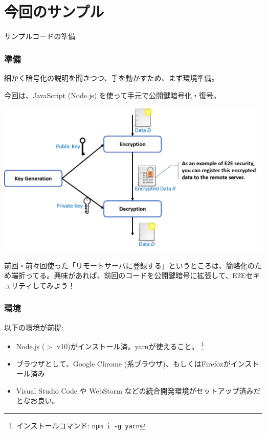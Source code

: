 \documentclass[12pt,dvipdfmx]{beamer}
\begin{document}
\section{今回のサンプル}
\begin{frame}
\centering
{\Large サンプルコードの準備}
\end{frame}

\begin{frame}
\frametitle{準備}
\small
細かく暗号化の説明を聞きつつ、手を動かすため、まず環境準備。

\alert{今回は、JavaScript (Node.js) を使って手元で公開鍵暗号化・復号。}

\begin{center}
 \includegraphics[width=0.8\linewidth]{Figs/pk-flow.png}%
\end{center}

前回・前々回使った「リモートサーバに登録する」というところは、簡略化のため端折ってる。興味があれば、前回のコードを公開鍵暗号に拡張して、E2Eセキュリティしてみよう！
\end{frame}

\begin{frame}
\frametitle{環境}
以下の環境が前提:
\begin{itemize}
 \item Node.js ($>$ v10)がインストール済。yarnが使えること。 \footnote[frame]{インストールコマンド: \texttt{npm i -g yarn}}
 \item ブラウザとして、Google Chrome (系ブラウザ)、もしくはFirefoxがインストール済み
 \item Visual Studio Code や WebStorm などの統合開発環境がセットアップ済みだとなお良い。
\end{itemize}
\end{frame}
\end{document}

